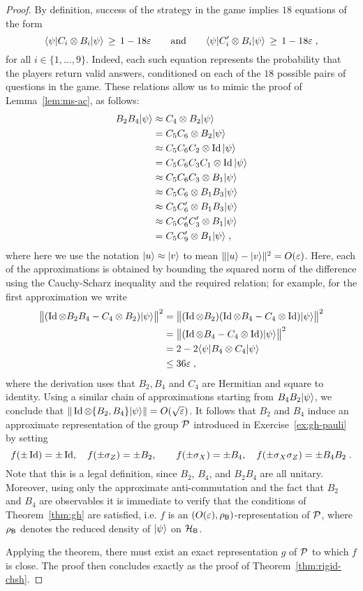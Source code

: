\begin{proof}
By definition, success of the strategy in the game implies $18$ equations of the form 
\begin{equation}\label{eq:ms-bc-1}
 \langle\psi| C_i \otimes B_i |\psi\rangle \,\geq \, 1-18\varepsilon\qquad\text{and}\qquad \langle\psi| C'_i \otimes B_i |\psi\rangle \,\geq \, 1-18\varepsilon\;,
\end{equation}
for all $i\in \{1,\ldots,9\}$. Indeed, each such equation represents the probability that the players return valid answers, conditioned on each of the $18$ possible pairs of questions in the game. These relations allow us to mimic the proof of Lemma~\ref{lem:ms-ac}, as follows: 
\begin{align*}
B_2 B_4 |\psi\rangle & \approx C_4 \otimes B_2 |\psi\rangle\\
&= C_5 C_6 \otimes B_2 |\psi\rangle\\
&\approx C_5 C_6 C_2 \otimes \mathop{\rm Id}\nolimits |\psi\rangle\\
&= C_5 C_6 C_3 C_1 \otimes \mathop{\rm Id}\nolimits |\psi\rangle\\
&\approx C_5C_6C_3 \otimes B_1 |\psi\rangle\\
&\approx C_5C_6\otimes B_1 B_3 |\psi\rangle\\
&\approx C_5C'_6\otimes B_1 B_3 |\psi\rangle\\
&\approx C_5C'_6 C'_3\otimes B_1  |\psi\rangle\\
&=  C_5C'_9\otimes B_1  |\psi\rangle\;,
\end{align*}
where here we use the notation $|u\rangle\approx |v\rangle$ to mean $\||u\rangle - |v\rangle\|^2 = O(\varepsilon)$. Here, each of the approximations is obtained by bounding the squared norm of the difference using the Cauchy-Scharz inequality and the required relation; for example, for the first approximation we write
\begin{align*}
 \big\|(\mathop{\rm Id}\nolimits \otimes B_2 B_4 - C_4 \otimes B_2)|\psi\rangle\big\|^2
&= \big\|(\mathop{\rm Id}\nolimits \otimes B_2)(\mathop{\rm Id}\nolimits\otimes B_4 - C_4 \otimes \mathop{\rm Id}\nolimits)|\psi\rangle\big\|^2\\
&= \big\|(\mathop{\rm Id}\nolimits\otimes B_4 - C_4 \otimes \mathop{\rm Id}\nolimits)|\psi\rangle\big\|^2\\ 
&= 2 - 2 \langle\psi| B_4 \otimes C_4 |\psi\rangle \\
& \leq 36\varepsilon\;,
\end{align*}
where the derivation uses that $B_2,B_4$ and $C_4$ are Hermitian and square to identity. 
Using a similar chain of approximations starting from $B_4 B_2 |\psi\rangle$, we conclude that $\|\mathop{\rm Id}\nolimits\otimes \{B_2,B_4\}|\psi\rangle\|=O(\sqrt{\varepsilon})$. It follows that $B_2$ and $B_4$ induce an approximate representation of the group $\mathcal{P}$ introduced in Exercise~\ref{ex:gh-pauli} by setting 
$$ f(\pm \mathop{\rm Id}\nolimits)=\pm\mathop{\rm Id}\nolimits,\quad f(\pm\sigma_Z)=\pm B_2,\quad\quad f(\pm\sigma_X)=\pm B_4,\quad f(\pm\sigma_X\sigma_Z) = \pm B_4B_2\;.$$
Note that this is a legal definition, since $B_2$, $B_4$, and $B_2B_4$ are all unitary. Moreover, using only the approximate anti-commutation and the fact that $B_2$ and $B_4$ are observables it is immediate to verify that the conditions of Theorem~\ref{thm:gh} are satisfied, i.e. $f$ is an $(O({\varepsilon}),\rho_{\textsf{B}})$-representation of $\mathcal{P}$, where $\rho_{\textsf{B}}$ denotes the reduced density of $|\psi\rangle$ on $\mathcal{H}_{\textsf{B}}$.  

Applying the theorem, there must exist an exact representation $g$ of $\mathcal{P}$ to which $f$ is close. The proof then concludes exactly as the proof of Theorem~\ref{thm:rigid-chsh}.
\end{proof}